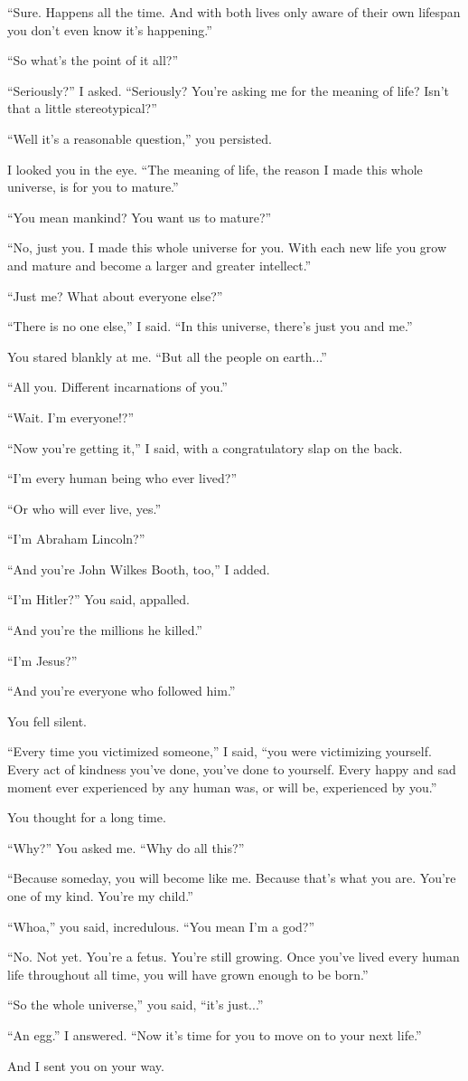 \documentclass{article}
\begin{document}
“Sure. Happens all the time. And with both lives only aware of their own lifespan you don't even know it's happening.”

“So what's the point of it all?”

“Seriously?” I asked. “Seriously? You're asking me for the meaning of life? Isn't that a little stereotypical?”

“Well it's a reasonable question,” you persisted.

I looked you in the eye. “The meaning of life, the reason I made this whole universe, is for you to mature.”

“You mean mankind? You want us to mature?”

“No, just you. I made this whole universe for you. With each new life you grow and mature and become a larger and greater intellect.”

“Just me? What about everyone else?”

“There is no one else,” I said. “In this universe, there's just you and me.”

You stared blankly at me. “But all the people on earth...”

“All you. Different incarnations of you.”

“Wait. I'm everyone!?”

“Now you're getting it,” I said, with a congratulatory slap on the back.

“I'm every human being who ever lived?”

“Or who will ever live, yes.”

“I'm Abraham Lincoln?”

“And you're John Wilkes Booth, too,” I added.

“I'm Hitler?” You said, appalled.

“And you're the millions he killed.”

“I'm Jesus?”

“And you're everyone who followed him.”

You fell silent.

“Every time you victimized someone,” I said, “you were victimizing yourself. Every act of kindness you've done, you've done to yourself. Every happy and sad moment ever experienced by any human was, or will be, experienced by you.”

You thought for a long time.

“Why?” You asked me. “Why do all this?”

“Because someday, you will become like me. Because that's what you are. You're one of my kind. You're my child.”

“Whoa,” you said, incredulous. “You mean I'm a god?”

“No. Not yet. You're a fetus. You're still growing. Once you've lived every human life throughout all time, you will have grown enough to be born.”

“So the whole universe,” you said, “it's just...”

“An egg.” I answered. “Now it's time for you to move on to your next life.”

And I sent you on your way.
\end{document}
